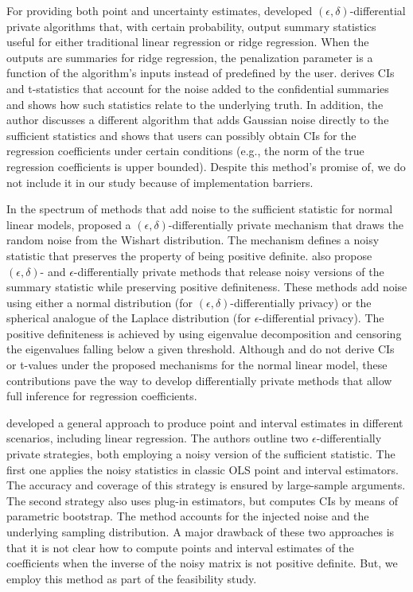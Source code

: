 For providing both point and uncertainty estimates, \citet{sheffet2017differentially} developed $(\epsilon,\delta)$-differential private algorithms that, with certain probability, output summary statistics useful for either traditional linear regression or ridge regression. When the outputs are summaries for ridge regression, the penalization parameter is a function of the algorithm's inputs instead of predefined by the user. \citet{sheffet2017differentially} derives CIs and t-statistics that account for the noise added to the confidential summaries and shows how such statistics relate to the underlying truth. In addition, the author discusses a different algorithm that adds Gaussian noise directly to the sufficient statistics and shows that users can possibly obtain CIs for the regression coefficients under certain conditions (e.g., the norm of the true regression coefficients is upper bounded). Despite this method's promise of, we do not include it in our study because of implementation barriers.

In the spectrum of methods that add noise to the sufficient statistic for normal linear models, \citet{sheffet2019old} proposed a $(\epsilon,\delta)$-differentially private mechanism that draws the random noise from the Wishart distribution. The mechanism defines a noisy statistic that preserves the property of being positive definite. \citet{wang2019differentially} also propose $(\epsilon,\delta)$- and $\epsilon$-differentially private methods that release noisy versions of the summary statistic while preserving positive definiteness. These methods add noise using either a normal distribution (for $(\epsilon,\delta)$-differentially privacy) or the spherical analogue of the Laplace distribution (for $\epsilon$-differential privacy). The positive definiteness is achieved by using eigenvalue decomposition and censoring the eigenvalues falling below a given threshold. Although \citet{sheffet2019old} and \citet{wang2019differentially} do not derive CIs or t-values under the proposed mechanisms for the normal linear model, these contributions pave the way to develop differentially private methods that allow full inference for regression coefficients.  

\citet{ferrando2020general} developed a general approach to produce point and interval estimates in different scenarios, including linear regression. The authors outline two $\epsilon$-differentially private strategies, both employing a noisy version of the sufficient statistic. The first one applies the noisy statistics in classic OLS point and interval estimators. The accuracy and coverage of this strategy is ensured by large-sample arguments. The second strategy also uses plug-in estimators, but computes CIs by means of parametric bootstrap. The method accounts for the injected noise and the underlying sampling distribution. A major drawback of these two approaches is that it is not clear how to compute points and interval estimates of the coefficients when the inverse of the noisy matrix is not positive definite. But, we employ this method as part of the feasibility study.

